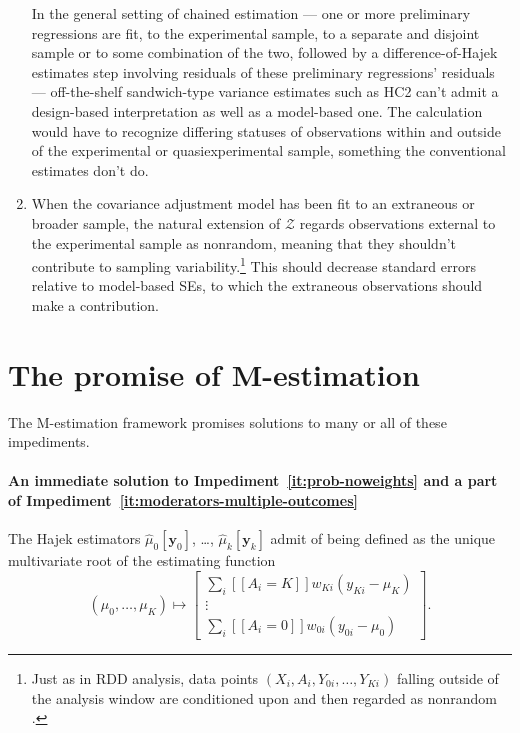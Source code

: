 \begin{enumerate}
  In the general setting of chained estimation ---  one or more
  preliminary regressions are fit, to the experimental sample, to a
  separate and disjoint sample or to some combination of the two,
  followed by a difference-of-Hajek estimates step involving residuals
  of these preliminary regressions' residuals --- off-the-shelf 
  sandwich-type variance estimates such as HC2 can't admit a design-based interpretation as well as
  a  model-based one. The calculation would have to recognize differing statuses of observations within and outside of the experimental or quasiexperimental sample, something the conventional estimates don't do. 
\item \label{it:prob-nonexperimentals-as-nonrandom}
  When the covariance adjustment model has been fit to an extraneous or
  broader sample, the natural extension of \(\mathcal{Z}\) regards
  observations external to the experimental sample as nonrandom, meaning
  that they shouldn't contribute to sampling variability.\footnote{Just as in
  RDD analysis, data points $(X_{i}, A_{i}, Y_{0i}, \ldots, Y_{Ki})$
  falling outside of the analysis window are
  conditioned upon and then regarded as nonrandom \citep[][display A1 on p.22]{salesHansen2019lrd}.} This should decrease standard
  errors relative to model-based SEs, to which the extraneous observations should make a 
contribution. 
\end{enumerate}

\section*{The promise of M-estimation}
The M-estimation framework promises solutions to many or all of
these impediments.  
\paragraph*{An immediate solution to
  Impediment~\ref{it:prob-noweights} and a part of Impediment~\ref{it:moderators-multiple-outcomes}}

The Hajek estimators $\hat{\mu}_{0}[\mathbf{y}_{0}]$, \ldots,
$\hat{\mu}_{k}[\mathbf{y}_{k}]$ admit of being defined as the unique
multivariate root of the estimating function
\begin{equation} \label{eq:ee-hajekdiff}
(\mu_{0}, \ldots, \mu_{K}) \mapsto
  \left[
\begin{array}{c}
\sum_i [\![A_i=K]\!] w_{Ki} (y_{Ki} - \mu_K) \\
\vdots \\
\sum_i [\![A_i=0]\!] w_{0i} (y_{0i} - \mu_0) 
\end{array}
\right]
.
\end{equation}

